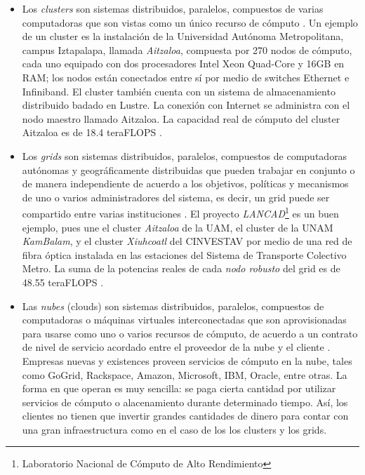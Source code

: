 \documentclass[letterpaper]{report}
\begin{document}
\begin{itemize}
\item Los \emph{clusters} son sistemas distribuidos, paralelos, compuestos de varias computadoras que son vistas como un único recurso de cómputo \cite{buyya2009cloud}. Un ejemplo de un cluster es la instalación de la Universidad Autónoma Metropolitana, campus Iztapalapa, llamada \emph{Aitzaloa}, compuesta por 270 nodos de cómputo, cada uno equipado con dos procesadores Intel Xeon Quad-Core y 16GB en RAM; los nodos están conectados entre sí por medio de switches Ethernet e Infiniband. El cluster también cuenta con un sistema de almacenamiento distribuido badado en Lustre. La conexión con Internet se administra con el nodo maestro llamado Aitzaloa. La capacidad real de cómputo del cluster Aitzaloa es de 18.4 teraFLOPS \cite{uamz2013tizaloa}.

\item Los \emph{grids} son sistemas distribuidos, paralelos, compuestos de computadoras autónomas y geográficamente distribuidas que pueden trabajar en conjunto o de manera independiente de acuerdo a los objetivos, políticas y mecanismos de uno o varios administradores del sistema, es decir, un grid puede ser compartido entre varias instituciones \cite{buyya2009cloud}. El proyecto \emph{LANCAD}\footnote{Laboratorio Nacional de Cómputo de Alto Rendimiento} es un buen ejemplo, pues une el cluster \emph{Aitzaloa} de la UAM, el cluster de la UNAM \emph{KamBalam}, y el cluster \emph{Xiuhcoatl} del CINVESTAV por medio de una red de fibra óptica instalada en las estaciones del Sistema de Transporte Colectivo Metro. La suma de la potencias reales de cada \emph{nodo robusto} del grid es de 48.55 teraFLOPS \cite{lancad2013xiuhcoatl}.

\item Las \emph{nubes} (clouds) son sistemas distribuidos, paralelos, compuestos de computadoras o máquinas virtuales interconectadas que son aprovisionadas para usarse como uno o varios recursos de cómputo, de acuerdo a un contrato de nivel de servicio acordado entre el proveedor de la nube y el cliente \cite{buyya2009cloud}. Empresas nuevas y existences proveen servicios de cómputo en la nube, tales como GoGrid, Rackspace, Amazon, Microsoft, IBM, Oracle, entre otras. La forma en que operan es muy sencilla: se paga cierta cantidad por utilizar servicios de cómputo o alacenamiento durante determinado tiempo. Así, los clientes no tienen que invertir grandes cantidades de dinero para contar con una gran infraestructura como en el caso de los los clusters y los grids.
\end{itemize}
\end{document}
